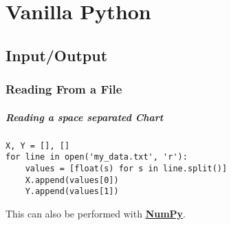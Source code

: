 \chapter{Vanilla Python}

\section{Input/Output}

\subsection{Reading From a File}

\paragraph{Reading a space separated Chart}
\begin{verbatim}
X, Y = [], []
for line in open('my_data.txt', 'r'):
	values = [float(s) for s in line.split()]
	X.append(values[0])
	Y.append(values[1])
\end{verbatim}
This can also be performed with \hyperref[sec:NumPyIO]{\textbf{NumPy}}.